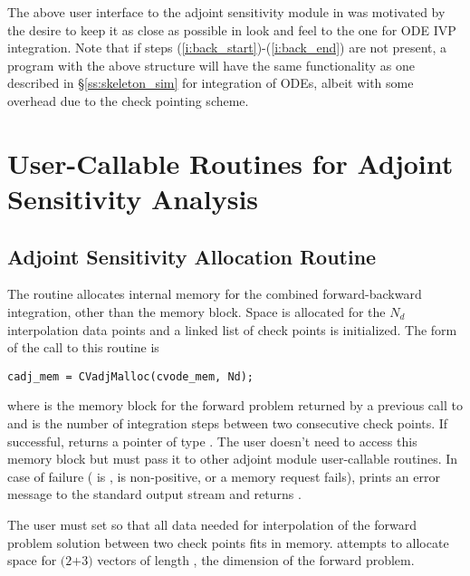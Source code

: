 The above user interface to the adjoint sensitivity module in {\cvodes} was motivated by
the desire to keep it as close as possible in look and feel to the one for ODE IVP 
integration. Note that if steps (\ref{i:back_start})-(\ref{i:back_end}) are not present, 
a program with the above structure will have the same functionality as one described in
\S\ref{ss:skeleton_sim} for integration of ODEs, albeit with some overhead due to 
the check pointing scheme.

\section{User-Callable Routines for Adjoint Sensitivity Analysis}

\subsection{Adjoint Sensitivity Allocation Routine}\label{sss:cvadjmalloc}

The routine  allocates internal memory for the combined
forward-backward integration, other than the {\cvodes} memory block. Space is allocated 
for the $N_d$ interpolation data points and a linked list of check points is 
initialized.
The form of the call to this routine is
\begin{verbatim}
cadj_mem = CVadjMalloc(cvode_mem, Nd);
\end{verbatim}
where  is the {\cvodes} memory block for the forward problem
returned by a previous call to  and  is the number of
integration steps between two consecutive check points.
If successful,  returns a pointer of type . The user
doesn't need to access this memory block but must pass it to other adjoint module
user-callable routines. In case of failure ( is ,  is
non-positive, or a memory request fails),  prints an error
message to the standard output stream  and returns .

The user must set  so that all data needed for interpolation of the 
forward problem solution between two check points fits in memory. 
attempts to allocate space for $(2$$+3)$ vectors of length , the
dimension of the forward problem.

